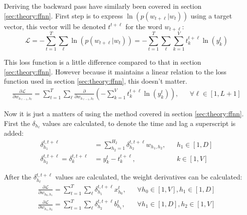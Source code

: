 Deriving the backward pass have similarly been covered in section \ref{sec:theory:ffnn}. First step is to express $\ln( p(w_{t + \ell} | w_t) )$ using a target vector, this vector will be denoted $t^{t+\ell}$ for the word $w_{t + \ell}$:
\begin{equation}
\mathcal{L} =  - \sum_{t = 1}^T \sum_{\ell} \ln( p(w_{t + \ell} | w_t)) =  - \sum_{t = 1}^T \sum_{\ell} \sum_{k=1}^V t_k^{t+\ell} \ln(y_k^t)
\end{equation}

This loss function is a little difference compared to that in section \ref{sec:theory:ffnn}. However because it maintains a linear relation to the loss function used in section \ref{sec:theory:ffnn}, this doesn't matter.
\begin{equation}
\begin{aligned}
\frac{\partial \mathcal{L}}{\partial w_{h_{\ell-1}, h_\ell}} = \sum_{t = 1}^T \sum_{\ell} \frac{\partial}{\partial w_{h_{\ell-1}, h_\ell}} \left(- \sum_{k=1}^V t_k^{t+\ell} \ln(y_k^t)\right), && \forall \ell \in [1, L + 1]
\end{aligned}
\end{equation}

Now it is just a matters of using the method covered in section \ref{sec:theory:ffnn}. First the $\delta_{h_\ell}$ values are calculated, to denote the time and lag a superscript is added:
\begin{equation}
\begin{aligned}
\delta_{h_1}^{t, t + \ell} &= \sum_{h_2=1}^{H_2} \delta_{h_2}^{t, t + \ell} w_{h_1, h_2}, && h_1 \in [1, D] \\
\delta_{h_2}^{t, t + \ell} = \delta_{k}^{t, t + \ell} &= y_k^t - t_k^{t+\ell}, && k \in [1, V]
\end{aligned}
\end{equation}

After the $\delta_{h_\ell}^{t, t+\ell}$ values are calculated, the weight derivatives can be calculated:
\begin{equation}
\begin{aligned}
\frac{\partial \mathcal{L}}{\partial w_{h_{0}, h_1}}= \sum_{t = 1}^T \sum_{\ell} \delta_{h_1}^{t, t + \ell} x_{h_0}^t, && \forall h_0 \in [1, V], h_1 \in [1, D] \\
\frac{\partial \mathcal{L}}{\partial w_{h_{1}, h_2}}= \sum_{t = 1}^T \sum_{\ell} \delta_{h_2}^{t, t + \ell} b_{h_1}^t, && \forall h_1 \in [1, D], h_2 \in [1, V]
\end{aligned}
\end{equation}
